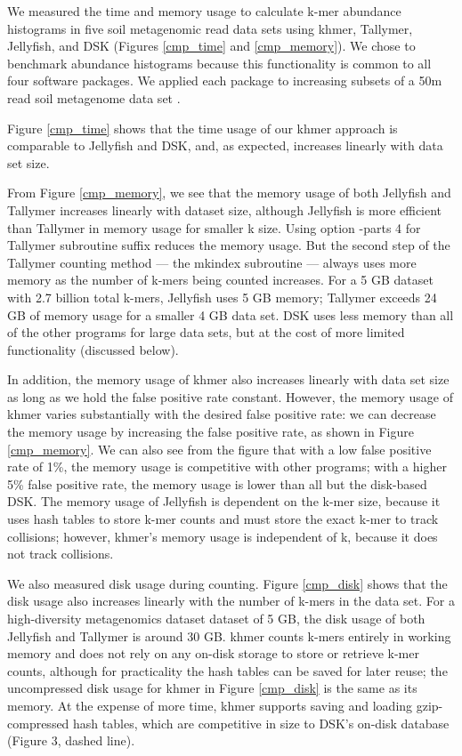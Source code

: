 \documentclass{article}
\begin{document}
We measured the time and memory usage to calculate k-mer abundance
histograms in five soil metagenomic read data sets using khmer,
Tallymer, Jellyfish, and DSK (Figures \ref{cmp_time} and
\ref{cmp_memory}).  We chose to benchmark abundance histograms because
this functionality is common to all four software packages.
We applied each package to increasing subsets of a 50m read soil
metagenome data set \cite{Howe2012}.

Figure \ref{cmp_time} shows that the time usage of our khmer approach
is comparable to Jellyfish and DSK, and, as expected, increases linearly
with data set size.

From Figure \ref{cmp_memory}, we see that the memory usage of both
Jellyfish and Tallymer increases linearly with dataset size, although
Jellyfish is more efficient than Tallymer in memory usage for smaller
k size. Using option -parts 4 for Tallymer subroutine suffix reduces
the memory usage. But the second step of the Tallymer counting method
--- the mkindex subroutine --- always uses more memory as the number
of k-mers being counted increases.  For a 5 GB dataset with 2.7
billion total k-mers, Jellyfish uses 5 GB memory; Tallymer exceeds 24
GB of memory usage for a smaller 4 GB data set.  DSK uses less memory
than all of the other programs for large data sets, but at the cost
of more limited functionality (discussed below).

In addition, the memory usage of khmer also increases linearly with
data set size as long as we hold the false positive rate constant.  However,
the memory usage of khmer varies substantially with the desired false
positive rate: we can decrease the memory usage by increasing the
false positive rate, as shown in Figure \ref{cmp_memory}.  We can also
see from the figure that with a low false positive rate of 1\%, the
memory usage is competitive with other programs; with a higher 5\%
false positive rate, the memory usage is lower than all but the
disk-based DSK.
The memory usage of Jellyfish is dependent on the k-mer
size, because it uses hash tables to store k-mer counts and must store
the exact k-mer to track collisions; however, khmer's memory
usage is independent of k, because it does not track collisions.

We also measured disk usage during counting.
Figure \ref{cmp_disk} shows that
the disk usage also increases linearly with the number of k-mers in the
data set.
For a high-diversity metagenomics dataset
dataset of 5 GB, the disk usage of both Jellyfish and Tallymer is
around 30 GB.  khmer counts k-mers entirely in working memory and does
not rely on any on-disk storage to store or retrieve k-mer counts,
although for practicality the hash tables can be saved for later
reuse; the uncompressed disk usage for khmer in Figure \ref{cmp_disk}
is the same as its memory.  At the expense of more time, khmer
supports saving and loading gzip-compressed hash tables, which are
competitive in size to DSK's on-disk database (Figure 3, dashed line).
\end{document}
